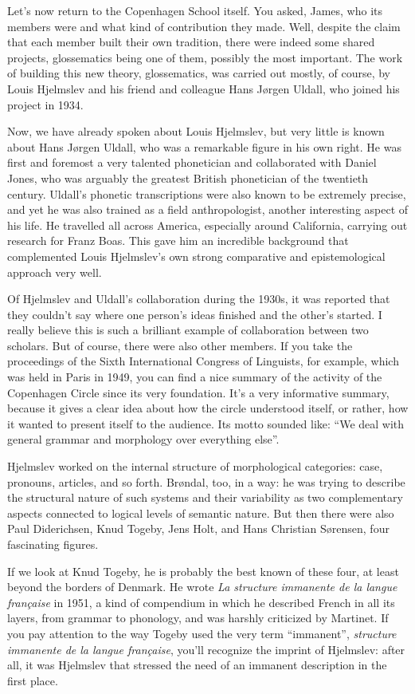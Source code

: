 \documentclass[output=paper]{langscibook}
\begin{document}
Let’s now return to the Copenhagen School itself. You asked, James, who its members were and what kind of contribution they made. Well, despite the claim that each member built their own tradition, there were indeed some shared projects, glossematics being one of them, possibly the most important. The work of building this new theory, glossematics, was carried out mostly, of course, by Louis Hjelmslev and his friend and colleague Hans Jørgen Uldall, who joined his project in 1934. 

Now, we have already spoken about Louis Hjelmslev, but very little is known about Hans Jørgen Uldall, who was a remarkable figure in his own right. He was first and foremost a very talented phonetician and collaborated with Daniel Jones, who was arguably the greatest British phonetician of the twentieth century. Uldall’s phonetic transcriptions were also known to be extremely precise, and yet he was also trained as a field anthropologist, another interesting aspect of his life. He travelled all across America, especially around California, carrying out research for Franz Boas. This gave him an incredible background that complemented Louis Hjelmslev’s own strong comparative and epistemological approach very well. 

Of Hjelmslev and Uldall’s collaboration during the 1930s, it was reported that they couldn’t say where one person’s ideas finished and the other’s started. I really believe this is such a brilliant example of collaboration between two scholars. But of course, there were also other members. If you take the proceedings of the Sixth International Congress of Linguists, for example, which was held in Paris in 1949, you can find a nice summary of the activity of the Copenhagen Circle since its very foundation. It’s a very informative summary, because it gives a clear idea about how the circle understood itself, or rather, how it wanted to present itself to the audience. Its motto sounded like: “We deal with general grammar and morphology over everything else”.

Hjelmslev worked on the internal structure of morphological categories: case, pronouns, articles, and so forth. Brøndal, too, in a way: he was trying to describe the structural nature of such systems and their variability as two complementary aspects connected to logical levels of semantic nature. But then there were also Paul Diderichsen, Knud Togeby, Jens Holt, and Hans Christian Sørensen, four fascinating figures.

If we look at Knud Togeby, he is probably the best known of these four, at least beyond the borders of Denmark. He wrote \textit{La structure immanente de la langue française} in 1951, a kind of compendium in which he described French in all its layers, from grammar to phonology, and was harshly criticized by Martinet. If you pay attention to the way Togeby used the very term ``immanent'', \textit{structure immanente de la langue française}, you’ll recognize the imprint of Hjelmslev: after all, it was Hjelmslev that stressed the need of an immanent description in the first place.
\end{document}
